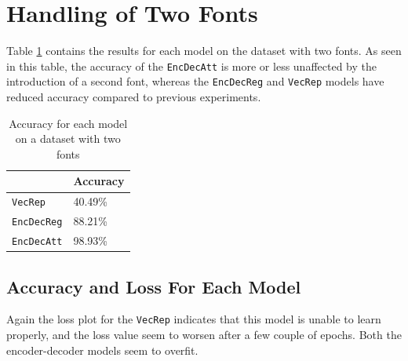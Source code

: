 
\section{Handling of Two Fonts}
\label{sec:handling_of_two_fonts}
Table \ref{table:accuracy_two_fonts} contains the results for each model on the dataset with two fonts. As seen in this table, the accuracy of the {\tt EncDecAtt} is more or less unaffected by the introduction of a second font, whereas the {\tt EncDecReg} and {\tt VecRep} models have reduced accuracy compared to previous experiments. 

\begin{table}[H]
    \centering
    \begin{tabular}{|l|l|}
        \hline 
                                        & \textbf{Accuracy}         \\ \hline
        {\tt VecRep }                   & 40.49\%                   \\ \hline
        {\tt EncDecReg}                 & 88.21\%                   \\ \hline
        {\tt EncDecAtt}                 & 98.93\%                   \\ \hline
    \end{tabular}
    \caption{Accuracy for each model on a dataset with two fonts}
    \label{table:accuracy_two_fonts}
\end{table}

\subsection{Accuracy and Loss For Each Model}

Again the loss plot for the {\tt VecRep} indicates that this model is unable to learn properly, and the loss value seem to worsen after a few couple of epochs. Both the encoder-decoder models seem to overfit.


